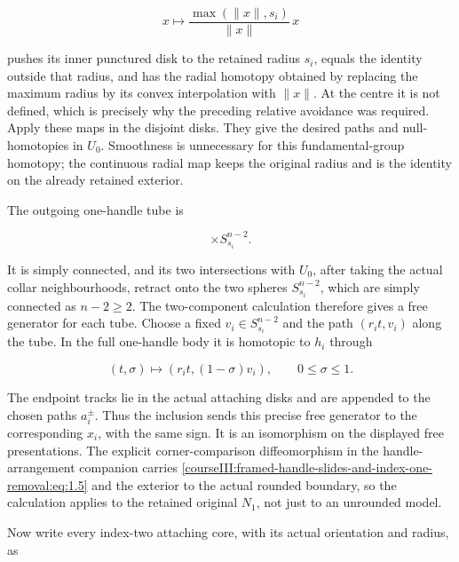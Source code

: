 \begin{equation}
x\longmapsto \frac{\max(\|x\|,s_i)}{\|x\|}\,x
 \label{courseIII:framed-handle-slides-and-index-one-removal:eq:1.4}
\end{equation}

pushes its inner punctured disk to the retained radius \(s_i\), equals the identity outside that radius, and has the radial homotopy obtained by replacing the maximum radius by its convex interpolation with \(\|x\|\). At the centre it is not defined, which is precisely why the preceding relative avoidance was required. Apply these maps in the disjoint disks. They give the desired paths and null-homotopies in \(U_0\). Smoothness is unnecessary for this fundamental-group homotopy; the continuous radial map keeps the original radius and is the identity on the already retained exterior.

The outgoing one-handle tube is

\begin{equation}
[-r_i,r_i]\times S^{n-2}_{s_i}.
 \label{courseIII:framed-handle-slides-and-index-one-removal:eq:1.5}
\end{equation}

It is simply connected, and its two intersections with \(U_0\), after taking the actual collar neighbourhoods, retract onto the two spheres \(S^{n-2}_{s_i}\), which are simply connected as \(n-2\geq2\). The two-component calculation therefore gives a free generator for each tube. Choose a fixed \(v_i\in S^{n-2}_{s_i}\) and the path \((r_it,v_i)\) along the tube. In the full one-handle body it is homotopic to \(h_i\) through

\begin{equation}
(t,\sigma)\longmapsto(r_it,(1-\sigma)v_i),
 \qquad 0\leq\sigma\leq1.
 \label{courseIII:framed-handle-slides-and-index-one-removal:eq:1.6}
\end{equation}

The endpoint tracks lie in the actual attaching disks and are appended to the chosen paths \(a_i^\pm\). Thus the inclusion sends this precise free generator to the corresponding \(x_i\), with the same sign. It is an isomorphism on the displayed free presentations. The explicit corner-comparison diffeomorphism in the handle-arrangement companion carries \eqref{courseIII:framed-handle-slides-and-index-one-removal:eq:1.5} and the exterior to the actual rounded boundary, so the calculation applies to the retained original \(N_1\), not just to an unrounded model.

Now write every index-two attaching core, with its actual orientation and radius, as

